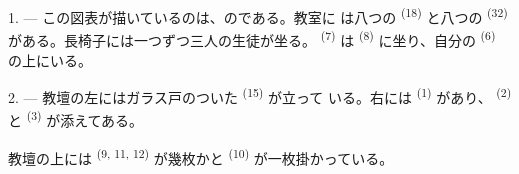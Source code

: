 %
%

\VUsaut{2.0mm}
\VUsaut{3.2mm}
\VUsaut{2.6mm}
\VUsaut{3.4mm}
\VUornamento{9pt}
\VUsaut{5.0mm}
\VUsaut{3.0mm}
\VUfilet{16mm}
\VUsaut{5.6mm}

\VUsaut{1.4mm}
\VUsaut{2.2mm}
\VUfilet{20mm}
\VUsaut{6.4mm}

\VUsaut{3.0mm}

1. --- この図表が描いているのは、のである。教室に
は八つの \textsuperscript{(18)} と八つの
\textsuperscript{(32)} がある。長椅子には一つずつ三人の生徒が坐る。
 \textsuperscript{(7)} は \textsuperscript{(8)} に坐り、自分の
 \textsuperscript{(6)} の上にいる。

2. --- 教壇の左にはガラス戸のついた \textsuperscript{(15)} が立って
いる。右には \textsuperscript{(1)} があり、
\textsuperscript{(2)} と \textsuperscript{(3)} が添えてある。

教壇の上には \textsuperscript{(9, 11, 12)} が幾枚かと
\textsuperscript{(10)} が一枚掛かっている。

